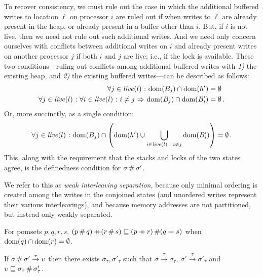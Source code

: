 \documentclass[11pt]{article}
\begin{document}
To recover consistency, we must rule out the case in which the additional buffered writes to location $\ell$ on processor $i$ are ruled out if when writes to $\ell$ are already present in the heap, or already present in a buffer other than $i$. But, if $i$ is not live, then we need not rule out such additional writes. And we need only concern ourselves with conflicts between additional writes on $i$ and already present writes on another processor $j$ if both $i$ and $j$ are live; i.e., if the lock is available. These two conditions---ruling out conflicts among additional buffered writes with \emph{1)} the existing heap, and \emph{2)} the existing buffered writes---can be described as follows: \begin{align*}
	\forall j \in  \mathit{live}(l) \operatorname{\,:\,} \operatorname{\mathrm{dom}}(B_j) \cap \operatorname{\mathrm{dom}}(h') & = \operatorname{\emptyset} \\
	\forall j \in  \mathit{live}(l) \operatorname{\,:\,} \forall i \in \mathit{live}(l) \operatorname{\,:\,} i \neq j \operatorname{\,\Rightarrow\,} \operatorname{\mathrm{dom}}(B_j) \cap \operatorname{\mathrm{dom}}(B'_i) & = \operatorname{\emptyset}. \\
\end{align*} Or, more succinctly, as a single condition: \[ \forall j \in \mathit{live}(l) \operatorname{\,:\,} \operatorname{\mathrm{dom}}(B_j) \cap \left( \operatorname{\mathrm{dom}}(h') \cup \bigcup_{i \in \mathit{live}(l) \operatorname{\,:\,} i \neq j} \operatorname{\mathrm{dom}}(B'_i)\right) = \operatorname{\emptyset}. \] 
This, along with the requirement that the stacks and locks of the two states agree, is the definedness condition for $\sigma \operatorname{\#} \sigma'$.

We refer to this as \emph{weak interleaving separation}, because only minimal ordering is created among the writes in the conjoined states (and unordered writes represent their various interleavings), and because memory addresses are not partitioned, but instead only weakly separated. 

\begin{lemma}
	\label{lem:hash-app-exchange}
	For pomsets $p,q,r,s$, $(p \fhash q) \lapp (r \fhash s) \refines (p \lapp r) \fhash (q \lapp s)$ when $\operatorname{\mathrm{dom}}(q) \cap \operatorname{\mathrm{dom}}(r) = \operatorname{\emptyset}$. 
\end{lemma}

\begin{lemma}
	\label{lem:separation-tau}
	If $\sigma \operatorname{\#} \sigma' \stackrel{\tau}{\rightarrow} \upsilon$ then there exists $\sigma_\tau,\sigma'_\tau$ such that $\sigma \stackrel{\tau}{\rightarrow} \sigma_\tau$, $\sigma' \stackrel{\tau}{\rightarrow} \sigma'_\tau$ and $\upsilon \sqsubseteq \sigma_\tau \operatorname{\#} \sigma'_\tau$. 
\end{lemma}
\end{document}
